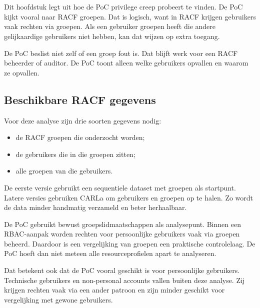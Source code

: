 \chapter[Analyse]{}%
\label{ch:analyse}

Dit hoofdstuk legt uit hoe de PoC privilege creep probeert te vinden. De PoC kijkt vooral naar RACF groepen. Dat is logisch, want in RACF krijgen gebruikers vaak rechten via groepen. Als een gebruiker groepen heeft die andere gelijkaardige gebruikers niet hebben, kan dat wijzen op extra toegang.

De PoC beslist niet zelf of een groep fout is. Dat blijft werk voor een RACF beheerder of auditor. De PoC toont alleen welke gebruikers opvallen en waarom ze opvallen.

\section{Beschikbare RACF gegevens}

Voor deze analyse zijn drie soorten gegevens nodig:

\begin{itemize}
	\item de RACF groepen die onderzocht worden;
	\item de gebruikers die in die groepen zitten;
	\item alle groepen van die gebruikers.
\end{itemize}

De eerste versie gebruikt een sequentiele dataset met groepen als startpunt. Latere versies gebruiken CARLa om gebruikers en groepen op te halen. Zo wordt de data minder handmatig verzameld en beter herhaalbaar.

De PoC gebruikt bewust groepslidmaatschappen als analysepunt. Binnen een RBAC-aanpak worden rechten voor persoonlijke gebruikers vaak via groepen beheerd. Daardoor is een vergelijking van groepen een praktische controlelaag. De PoC hoeft dan niet meteen alle resourceprofielen apart te analyseren.

Dat betekent ook dat de PoC vooral geschikt is voor persoonlijke gebruikers. Technische gebruikers en non-personal accounts vallen buiten deze analyse. Zij krijgen rechten vaak via een ander patroon en zijn minder geschikt voor vergelijking met gewone gebruikers.

